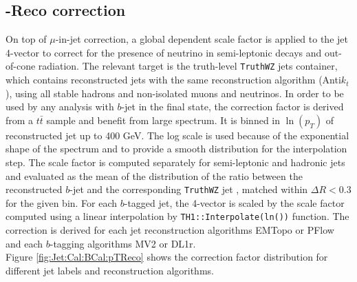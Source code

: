 \subsection{\pT-Reco correction}
\label{Jet:Cal:BCal:pTReco}
On top of $\mu$-in-jet correction, a global \pT dependent scale factor is applied to the jet 4-vector to correct for the presence of neutrino in semi-leptonic decays and out-of-cone radiation. The relevant target is the truth-level \texttt{TruthWZ} jets container, which contains reconstructed jets with the same reconstruction algorithm (Anti$k_t$), using all stable hadrons and non-isolated muons and neutrinos. In order to be used by any analysis with $b$-jet in the final state, the correction factor is derived from a $t\bar{t}$ sample and benefit from large \pT spectrum. It is binned in $\ln(p_T)$ of reconstructed jet up to 400 GeV. The log scale is used because of the exponential shape of the \pT spectrum and to provide a smooth distribution for the interpolation step. The scale factor is computed separately for semi-leptonic and hadronic jets and evaluated as the mean of the distribution of the ratio between the reconstructed $b$-jet \pT and the corresponding \texttt{TruthWZ} jet \pT, matched within $\Delta R < 0.3$ for the given \pT bin. For each $b$-tagged jet, the 4-vector is scaled by the scale factor computed using a linear interpolation by \texttt{TH1::Interpolate(ln(\pT))} function. The correction is derived for each jet reconstruction algorithms EMTopo or PFlow and each $b$-tagging algorithms MV2 or DL1r. \\
Figure \ref{fig:Jet:Cal:BCal:pTReco} shows the correction factor distribution for different jet labels and reconstruction algorithms. 
